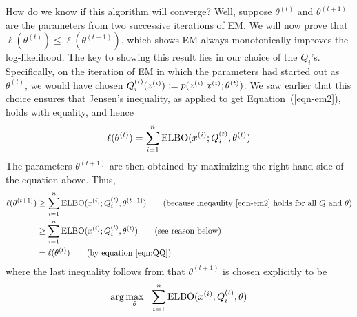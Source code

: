 \documentclass{article}
\begin{document}
How do we know if this algorithm will converge?  Well, suppose
$\theta^{(t)}$ and $\theta^{(t+1)}$ are the parameters from two
successive iterations of EM.  We will now prove that
$\ell(\theta^{(t)}) \leq \ell(\theta^{(t+1)})$, which shows
EM always monotonically improves the log-likelihood.
The key to showing this result lies in our choice of the $Q_i$'s.
Specifically, on the iteration of EM in which the parameters
had started out as $\theta^{(t)}$, we would have chosen
$Q_i^{(t)}({z^{(i)}}) := p({z^{(i)}} | {x^{(i)}}; \theta^{(t)})$.  We saw
earlier that this choice ensures that Jensen's inequality,
as applied to get Equation~(\ref{eqn-em2}), holds with equality,
and hence
\begin{align}
\ell(\theta^{(t)}) = \sum_{i=1}^{n} \textup{ELBO}({x^{(i)}}; Q^{(t)}_i,\theta^{(t)}) \label{eqn:QQ}
\end{align}
The parameters $\theta^{(t+1)}$ are then obtained by maximizing
the right hand side of the equation above.  Thus,
\begin{align}
\ell(\theta^{(t+1)}) &\geq
\sum_{i=1}^\nexp \elbo(\xsi; Q^{(t)}_i,\theta^{(t+1)}) \tag{because ineqaulity~\eqref{eqn-em2} holds for all $Q$ and $\theta$} \\
&\geq
\sum_{i=1}^\nexp \elbo(\xsi; Q^{(t)}_i,\theta^{(t)}) \tag{see reason below}\\
& = \ell(\theta^{(t)}) \tag{by equation~\eqref{eqn:QQ}}
\label{eqn-emproof3}
\end{align}
where the last inequality follows from that $\theta^{(t+1)}$ is chosen explicitly to be
\[
\arg\max_\theta  ~~\sum_{i=1}^\nexp\elbo(\xsi; Q^{(t)}_i,\theta) %
\]
\end{document}
